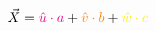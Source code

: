 \documentclass[preview]{standalone}
\begin{document}
$$\vec{X} = \textcolor{magenta}{\hat{u}\cdot a} + \textcolor{orange}{\hat{v}\cdot b} + \textcolor{yellow}{\hat{w}\cdot c}$$
\end{document}

